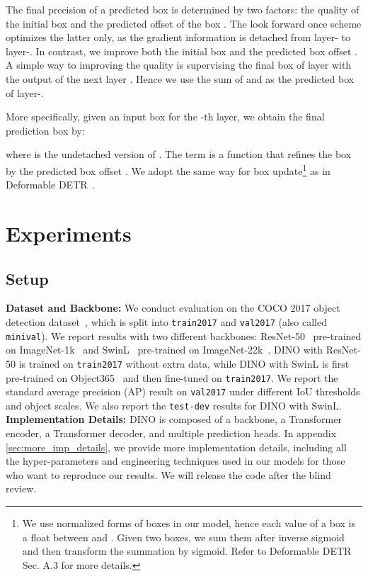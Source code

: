 \documentclass[runningheads]{llncs}
\begin{document}
The final precision of a predicted box  is determined by two factors: the quality of the initial box  and the predicted offset of the box . The look forward once scheme optimizes the latter only, as the gradient information is detached from layer- to layer-. In contrast, we improve both the initial box  and the predicted box offset . A simple way to improving the quality is supervising the final box  of layer  with the output of the next layer . Hence we use the sum of  and  as the predicted box of layer-.

More specifically, given an input box  for the -th layer, we obtain the final prediction box   by:




\noindent
where  is the undetached version of . The term  is a function that refines the box  by the predicted box offset . We adopt the same way for box update\footnote{We use normalized forms of boxes in our model, hence each value of a box is a float between  and . Given two boxes, we sum them after inverse sigmoid and then transform the summation by sigmoid. Refer to Deformable DETR~\cite{zhu2020deformable} Sec. A.3 for more details.} as in Deformable DETR~\cite{zhu2020deformable}. 

\section{Experiments}
\subsection{Setup}\label{sec:setup}
\textbf{Dataset and Backbone:}
We conduct evaluation on the COCO 2017 object detection dataset~\cite{lin2015microsoft}, which is split into \texttt{train2017} and \texttt{val2017} (also called \texttt{minival}). We report results with two different backbones: ResNet-50~\cite{he2015deep} pre-trained on ImageNet-1k~\cite{deng2009imagenet} and SwinL~\cite{liu2021swin} pre-trained on ImageNet-22k~\cite{deng2009imagenet}. 
DINO with ResNet-50 is trained on \texttt{train2017} without extra data, while DINO with SwinL is first pre-trained on Object365~\cite{shao2019objects365} and then fine-tuned on \texttt{train2017}.
We report the standard average precision (AP) result on \texttt{val2017} under different IoU thresholds and object scales. We also report the \texttt{test-dev} results for DINO with SwinL.
\\
\textbf{Implementation Details:}
 DINO is composed of a backbone, a Transformer encoder, a Transformer decoder, and multiple prediction heads. 
In appendix \ref{sec:more_imp_details}, we provide more implementation details, including all the hyper-parameters and engineering techniques used in our models for those who want to reproduce our results. We will release the code after the blind review.
\end{document}
